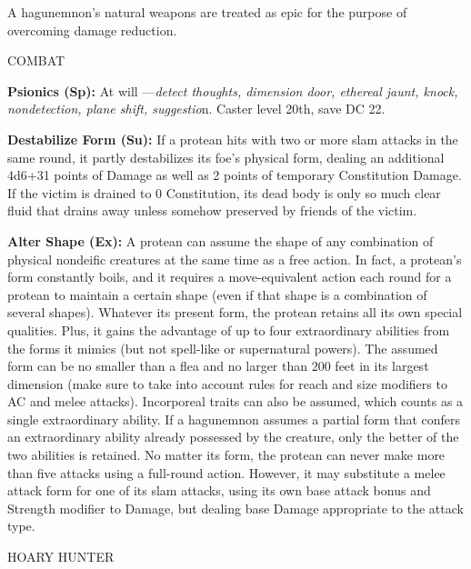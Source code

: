 \documentclass{article}
\begin{document}
{A hagunemnon's natural weapons are treated as epic for the purpose of overcoming 
damage reduction.

COMBAT 

\textbf{Psionics (Sp):} At will ---\textit{detect thoughts, dimension door, ethereal 
jaunt, knock, nondetection, plane shift, suggestio}n. Caster level 20th, save DC 
22. 

\textbf{Destabilize Form (Su):} If a protean hits with two or more slam attacks 
in the same round, it partly destabilizes its foe's physical form, dealing an additional 
4d6+31 points of Damage as well as 2 points of temporary Constitution Damage. If 
the victim is drained to 0 Constitution, its dead body is only so much clear fluid 
that drains away unless somehow preserved by friends of the victim. 

\textbf{Alter Shape (Ex):} A protean can assume the shape of any combination of 
physical nondeific creatures at the same time as a free action. In fact, a protean's 
form constantly boils, and it requires a move-equivalent action each round for 
a protean to maintain a certain shape (even if that shape is a combination of several 
shapes). Whatever its present form, the protean retains all its own special qualities. 
Plus, it gains the advantage of up to four extraordinary abilities from the forms 
it mimics (but not spell-like or supernatural powers). The assumed form can be 
no smaller than a flea and no larger than 200 feet in its largest dimension (make 
sure to take into account rules for reach and size modifiers to AC and melee attacks). 
Incorporeal traits can also be assumed, which counts as a single extraordinary 
ability. If a hagunemnon assumes a partial form that confers an extraordinary ability 
already possessed by the creature, only the better of the two abilities is retained. 
No matter its form, the protean can never make more than five attacks using a full-round 
action. However, it may substitute a melee attack form for one of its slam attacks, 
using its own base attack bonus and Strength modifier to Damage, but dealing base 
Damage appropriate to the attack type. 

\vspace{12pt}
{\LARGE{}HOARY HUNTER}

}
\end{document}
